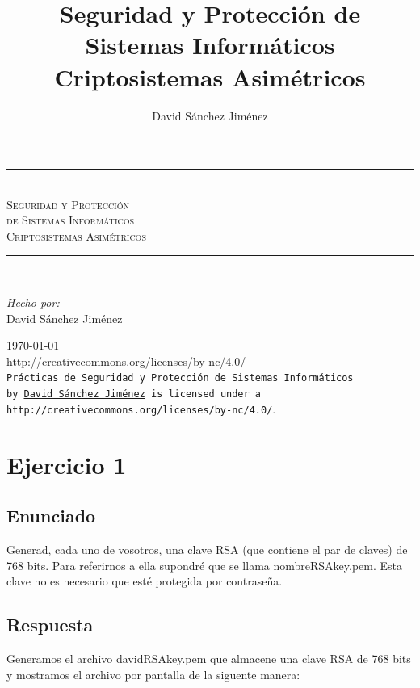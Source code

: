 \documentclass[10pt,a4paper,spanish]{report}
\title{Seguridad y Protección de Sistemas Informáticos \\
Criptosistemas Asimétricos}
\author{David Sánchez Jiménez}
\newcommand{\HRule}{\rule{\linewidth}{0.5mm}} %
\begin{document}
\begin{titlepage}
 \begin{center}
  \HRule \\[0.8cm]
  \textsc{\huge Seguridad y Protección \\ de Sistemas Informáticos \\[0.5cm] Criptosistemas Asimétricos}\\[1.6cm]
  \HRule \\[1cm]
  \begin{flushleft}
   \emph{Hecho por:}\\
   David Sánchez Jiménez
  \end{flushleft}
  \vspace{12cm}
  \large{\today}\\
  \vspace{0.5cm}
  {http://creativecommons.org/licenses/by-nc/4.0/}\\[0.5cm]
  \texttt{Prácticas de Seguridad y Protección de Sistemas Informáticos\\ by
   \href{mailto:dasaji92@gmail.com}{David Sánchez Jiménez} is licensed under a 
   {http://creativecommons.org/licenses/by-nc/4.0/}}.\\[3mm]
 \end{center}
\end{titlepage}

\tableofcontents
\newpage

\chapter{Ejercicio 1}

\section{Enunciado}
\noindent
Generad, cada uno de vosotros, una clave RSA (que contiene el par de claves) de 768 bits. Para referirnos a ella supondré que se llama nombreRSAkey.pem. Esta clave no es necesario que esté protegida por contraseña.

\section{Respuesta}
\noindent
Generamos el archivo davidRSAkey.pem que almacene una clave RSA de 768 bits y mostramos el archivo por pantalla de la siguente manera:
\end{document}
